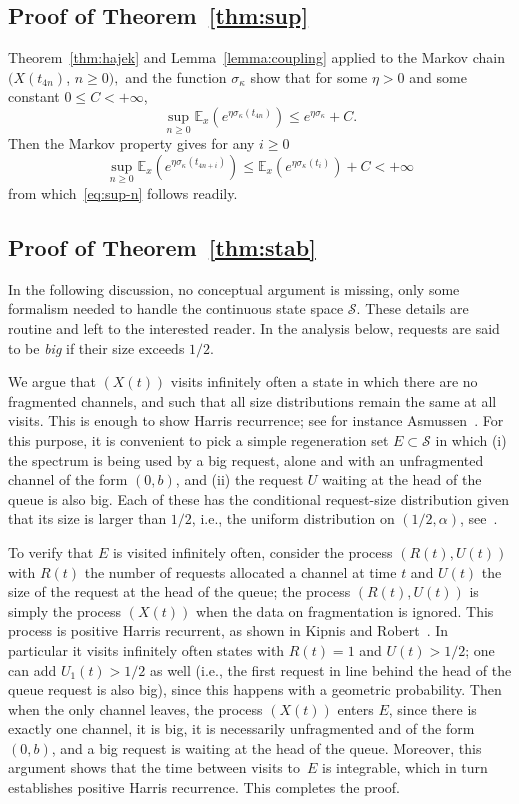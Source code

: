 \documentclass{amsart}
\def\E{\mathbb{E}}
\def\Scal{\mathcal{S}}
\begin{document}
\subsection*{Proof of Theorem~\ref{thm:sup}}
Theorem~\ref{thm:hajek} and Lemma~\ref{lemma:coupling} applied to
the Markov chain $(X(t_{4n})$, $n \geq 0),$ and the function
$\sigma_\kappa$ show that for some $\eta > 0$ and some constant $0
\leq C < +\infty$,
\[ \sup_{n \geq 0} \E_x \left( e^{\eta \sigma_\kappa(t_{4n}) } \right) \leq e^{\eta \sigma_\kappa} + C. \]
Then the Markov property gives for any $i \geq 0$
\[ \sup_{n \geq 0} \E_x \left( e^{\eta \sigma_\kappa(t_{4n+i}) } \right) \leq \E_x \left( e^{\eta \sigma_\kappa(t_i)} \right) + C < +\infty \]
from which~\eqref{eq:sup-n} follows readily.



\subsection*{Proof of Theorem~\ref{thm:stab}}  In the following
discussion, no conceptual argument is missing, only some formalism
needed to handle the continuous state space $\Scal$. These details
are routine and left to the interested reader. In the analysis
below, requests are said to be {\em big} if their size exceeds
$1/2$.

We argue that $(X(t))$ visits infinitely often a state in which
there are no fragmented channels, and such that all size
distributions remain the same at all visits. This is enough to show
Harris recurrence; see for instance Asmussen~\cite{Asmussen87:0}.
For this purpose, it is convenient to pick a simple regeneration set
$E \subset \Scal$ in which (i) the spectrum is being used by a big
request, alone and with an unfragmented channel of the form $(0,b)$,
and (ii) the request $U$  waiting at the head of the queue is also
big. Each of these has the conditional request-size distribution
given that its size is larger than $1/2$, i.e., the uniform
distribution on $(1/2,\alpha)$, see~\cite{KipnisR1990}.

To verify that $E$ is visited infinitely often, consider the process
$(R(t), U(t))$ with $R(t)$ the number of requests allocated a
channel at time $t$ and $U(t)$ the size of the request at the head
of the queue; the process $(R(t), U(t))$ is simply the process
$(X(t))$ when the data on fragmentation is ignored. This process is
positive Harris recurrent, as shown in Kipnis and
Robert~\cite{KipnisR1990}. In particular it visits infinitely
often states with $R(t) = 1$ and $U(t) > 1/2$; one can add $U_1(t) >
1/2$ as well (i.e., the first request in line behind the head of the queue request is also big), since
this happens with a geometric probability. Then when the only
channel leaves, the process $(X(t))$ enters $E$, since there is
exactly one channel, it is big, it is necessarily
unfragmented and of the form $(0,b)$, and a big request is waiting
at the head of the queue. Moreover, this argument shows that the
time between visits to~$E$ is integrable, which in turn establishes
positive Harris recurrence. This completes the proof.
\end{document}
